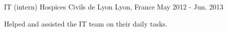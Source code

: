 \begin{cventries}
  \cventry
  {IT (intern)} %
  {Hospices Civils de Lyon} %
  {Lyon, France} %
  {May 2012 - Jun. 2013} %
    {
      \begin{cvitems} %
      \item {Helped and assisted the IT team on their daily tasks.}
      \end{cvitems}
    }

\end{cventries}
